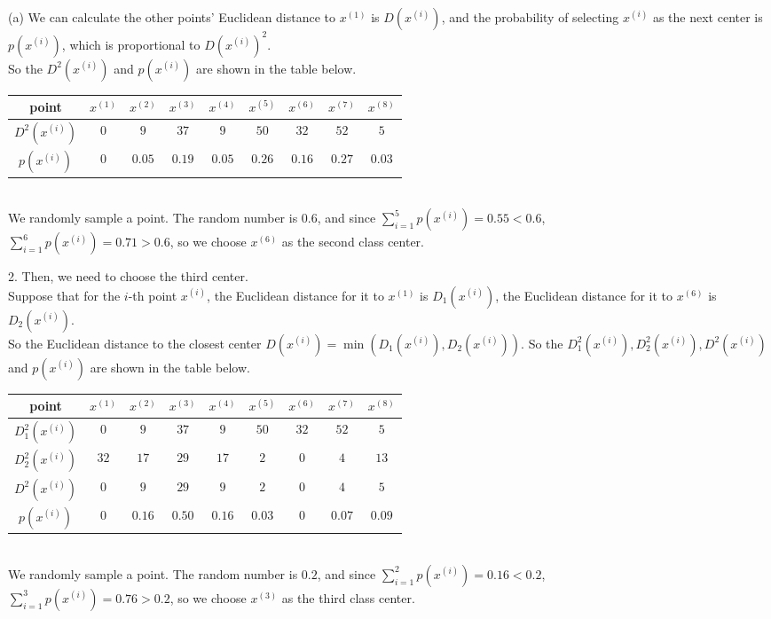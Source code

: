 \documentclass[10pt]{article}
\begin{document}
\begin{enumerate}[1.]
(a) We can calculate the other points' Euclidean distance to $x^{(1)}$ is $D(x^{(i)})$, and the probability of selecting $x^{(i)}$ as the next center is $p(x^{(i)})$, 
which is proportional to $D(x^{(i)})^2$.\\
So the $D^2(x^{(i)})$ and $p(x^{(i)})$ are shown in the table below.\\ 
\begin{tabular}{|c|c|c|c|c|c|c|c|c|}
	\hline
	point & $x^{(1)}$ & $x^{(2)}$ & $x^{(3)}$ & $x^{(4)}$ & $x^{(5)}$ & $x^{(6)}$ & $x^{(7)}$ & $x^{(8)}$\\
	\hline
	$D^2(x^{(i)})$ & $0$ & $9$ & $37$ & $9$ & $50$ & $32$ & $52$ & $5$\\
	\hline
	$p(x^{(i)})$ & $0$ & $0.05$ & $0.19$ & $0.05$ & $0.26$ & $0.16$ & $0.27$ & $0.03$\\
	\hline
\end{tabular}\\
We randomly sample a point. The random number is $0.6$, and since $\sum\limits_{i=1}^5 p(x^{(i)})=0.55<0.6$,\\
$\sum\limits_{i=1}^6 p(x^{(i)})=0.71>0.6$, so we choose $x^{(6)}$ as the second class center.

2. Then, we need to choose the third center.\\
Suppose that for the $i$-th point $x^{(i)}$, the Euclidean distance for it to $x^{(1)}$ is $D_1(x^{(i)})$,
the Euclidean distance for it to $x^{(6)}$ is $D_2(x^{(i)})$.\\
So the Euclidean distance to the closest center $D(x^{(i)})=\min(D_1(x^{(i)}),D_2(x^{(i)}))$.
So the $D_1^2(x^{(i)}),D_2^2(x^{(i)}),D^2(x^{(i)})$ and $p(x^{(i)})$ are shown in the table below.\\ 
\begin{tabular}{|c|c|c|c|c|c|c|c|c|}
	\hline
	point & $x^{(1)}$ & $x^{(2)}$ & $x^{(3)}$ & $x^{(4)}$ & $x^{(5)}$ & $x^{(6)}$ & $x^{(7)}$ & $x^{(8)}$\\
	\hline
	$D_1^2(x^{(i)})$ & $0$ & $9$ & $37$ & $9$ & $50$ & $32$ & $52$ & $5$\\
	\hline
	$D_2^2(x^{(i)})$ & $32$ & $17$ & $29$ & $17$ & $2$ & $0$ & $4$ & $13$\\
	\hline
	$D^2(x^{(i)})$ & $0$ & $9$ & $29$ & $9$ & $2$ & $0$ & $4$ & $5$\\
	\hline
	$p(x^{(i)})$ & $0$ & $0.16$ & $0.50$ & $0.16$ & $0.03$ & $0$ & $0.07$ & $0.09$\\
	\hline
\end{tabular}\\
We randomly sample a point. The random number is $0.2$, and since $\sum\limits_{i=1}^2p(x^{(i)})=0.16<0.2$,\\
$\sum\limits_{i=1}^3p(x^{(i)})=0.76>0.2$, so we choose $x^{(3)}$ as the third class center.


\end{enumerate}
\end{document}
